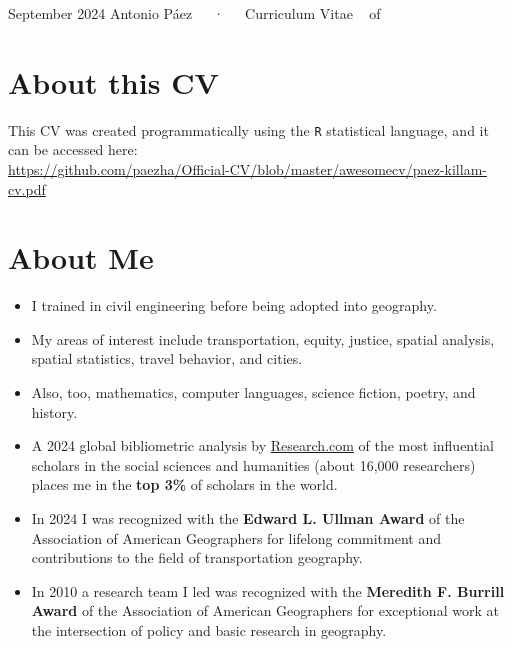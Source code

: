 \documentclass[11pt,a4paper,]{awesome-cv}
\providecommand{\tightlist}{%
	\setlength{\itemsep}{0pt}\setlength{\parskip}{0pt}}
\begin{document}
\makecvheader

\makecvfooter
  {September 2024}
    {Antonio Páez~~~·~~~Curriculum Vitae}
  {\thepage~ of \pageref{LastPage}~}





\section{About this CV}\label{about-this-cv}

This CV was created programmatically using the \texttt{R} statistical
language, and it can be accessed here:\\
\url{https://github.com/paezha/Official-CV/blob/master/awesomecv/paez-killam-cv.pdf}

\section{About Me}\label{about-me}

\begin{itemize}
\tightlist
\item
  I trained in civil engineering before being adopted into geography.
\item
  My areas of interest include transportation, equity, justice, spatial
  analysis, spatial statistics, travel behavior, and cities.
\item
  Also, too, mathematics, computer languages, science fiction, poetry,
  and history.
\item
  A 2024 global bibliometric analysis by
  \href{https://research.com/scientists-rankings/social-sciences-and-humanities/ca}{Research.com}
  of the most influential scholars in the social sciences and humanities
  (about 16,000 researchers) places me in the \textbf{top 3\%} of
  scholars in the world.
\item
  In 2024 I was recognized with the \textbf{Edward L. Ullman Award} of
  the Association of American Geographers for lifelong commitment and
  contributions to the field of transportation geography.
\item
  In 2010 a research team I led was recognized with the \textbf{Meredith
  F. Burrill Award} of the Association of American Geographers for
  exceptional work at the intersection of policy and basic research in
  geography.
\end{itemize}
\end{document}
